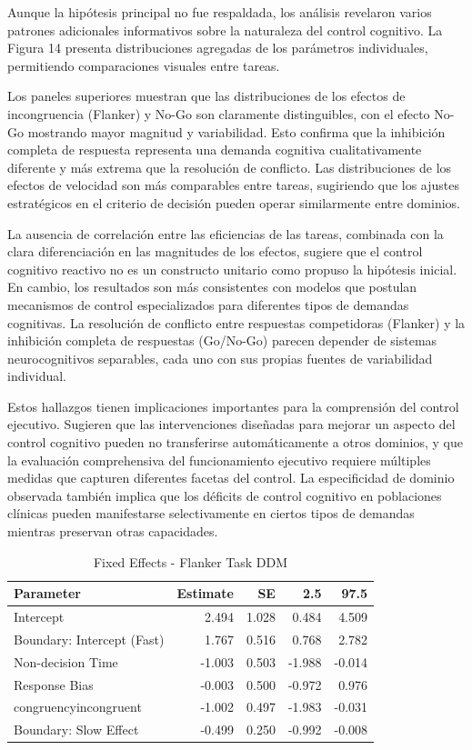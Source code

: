 \documentclass[
  spanish,
  10pt,
]{article}
\begin{document}
Aunque la hipótesis principal no fue respaldada, los análisis revelaron
varios patrones adicionales informativos sobre la naturaleza del control
cognitivo. La Figura 14 presenta distribuciones agregadas de los
parámetros individuales, permitiendo comparaciones visuales entre
tareas.

Los paneles superiores muestran que las distribuciones de los efectos de
incongruencia (Flanker) y No-Go son claramente distinguibles, con el
efecto No-Go mostrando mayor magnitud y variabilidad. Esto confirma que
la inhibición completa de respuesta representa una demanda cognitiva
cualitativamente diferente y más extrema que la resolución de conflicto.
Las distribuciones de los efectos de velocidad son más comparables entre
tareas, sugiriendo que los ajustes estratégicos en el criterio de
decisión pueden operar similarmente entre dominios.

La ausencia de correlación entre las eficiencias de las tareas,
combinada con la clara diferenciación en las magnitudes de los efectos,
sugiere que el control cognitivo reactivo no es un constructo unitario
como propuso la hipótesis inicial. En cambio, los resultados son más
consistentes con modelos que postulan mecanismos de control
especializados para diferentes tipos de demandas cognitivas. La
resolución de conflicto entre respuestas competidoras (Flanker) y la
inhibición completa de respuestas (Go/No-Go) parecen depender de
sistemas neurocognitivos separables, cada uno con sus propias fuentes de
variabilidad individual.

Estos hallazgos tienen implicaciones importantes para la comprensión del
control ejecutivo. Sugieren que las intervenciones diseñadas para
mejorar un aspecto del control cognitivo pueden no transferirse
automáticamente a otros dominios, y que la evaluación comprehensiva del
funcionamiento ejecutivo requiere múltiples medidas que capturen
diferentes facetas del control. La especificidad de dominio observada
también implica que los déficits de control cognitivo en poblaciones
clínicas pueden manifestarse selectivamente en ciertos tipos de demandas
mientras preservan otras capacidades.

\begin{table}[H]
\centering
\caption{\label{tab:unnamed-chunk-2}Fixed Effects - Flanker Task DDM}
\centering
\begin{tabular}[t]{lrrrr}
\toprule
Parameter & Estimate & SE & 2.5 & 97.5\\
\midrule
Intercept & 2.494 & 1.028 & 0.484 & 4.509\\
Boundary: Intercept (Fast) & 1.767 & 0.516 & 0.768 & 2.782\\
Non-decision Time & -1.003 & 0.503 & -1.988 & -0.014\\
Response Bias & -0.003 & 0.500 & -0.972 & 0.976\\
congruencyincongruent & -1.002 & 0.497 & -1.983 & -0.031\\
\addlinespace
Boundary: Slow Effect & -0.499 & 0.250 & -0.992 & -0.008\\
\bottomrule
\end{tabular}
\end{table}
\end{document}
